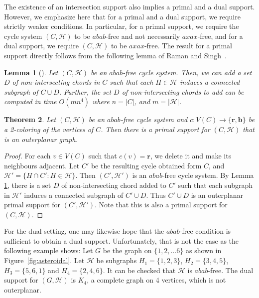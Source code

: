 \documentclass[12pt]{article}
\newcommand{\R}{\mathbf{r}}
\newcommand{\B}{\mathbf{b}}
\newcommand{\HH}{\mathcal{H}}
\newtheorem{theorem}{Theorem}
\newtheorem{lemma}[theorem]{Lemma}
\theoremstyle{case}
\begin{document}
The existence of an intersection support also implies a primal and a dual support.
However, we emphasize here that for a primal and a dual support, we require strictly weaker conditions.
In particular, for a primal support, we require the cycle system $(C,\HH)$ to be $abab$-free and not necessarily $axax$-free, and for a dual support, we require $(C,\HH)$ to be $axax$-free.
The result for a primal support directly follows from the following lemma of Raman and Singh~\cite{raman2025supportsgraphsboundedgenus}.

\begin{lemma}[\cite{raman2025supportsgraphsboundedgenus}]
\label{lem:nblock}
Let $(C,\HH)$ be an $abab$-free cycle system.
Then, we can add a set $D$ of non-intersecting chords in $C$ such that each $H\in\mathcal{H}$ 
induces a connected subgraph of $C\cup D$. Further, the set $D$ of non-intersecting chords to add can be computed in time $O(mn^4)$ where $n=|C|$, and $m=|\HH|$.
\end{lemma}

\begin{theorem}\label{thm:primalopsupport}
Let $(C,\HH)$ be an $abab$-free cycle system and $c:V(C)\to\{\R,\B\}$ be a 2-coloring of the vertices of $C$.
Then there is a primal support for $(C,\HH)$ that is an outerplanar graph.
\end{theorem}
\begin{proof}
For each $v\in V(C)$ such that $c(v)=\R$, we delete it and make its neighbours adjacent.
Let $C'$ be the resulting cycle obtained form $C$, and $\HH'=\{H\cap C':H\in\HH\}$.
Then $(C',\HH')$ is an $abab$-free cycle system.
By Lemma \ref{lem:nblock}, there is a set $D$ of non-intersecting chord added to $C'$ such that each subgraph in $\HH'$ induces a connected subgraph of $C'\cup D$. Thus $C'\cup D$ is an outerplanar primal support for $(C',\HH')$.
Note that this is also a primal support for $(C,\HH)$.
\end{proof}

For the dual setting, one may likewise hope that
the $abab$-free condition is sufficient to obtain a
dual support. Unfortunately, that is not the case as the following
example shows:
Let $G$ be the graph on $\{1,2,\ldots 6\}$ as shown in Figure~\ref{fig:asteroidal}.
Let $\mathcal{H}$ be subgraphs 
$H_1=\{1,2,3\}$, $H_2=\{3,4,5\}$, $H_3=\{5,6,1\}$ and $H_4=\{2,4,6\}$.
It can be checked that $\mathcal{H}$ is $abab$-free.
The dual support for $(G,\HH)$ is $K_4$, a complete graph on 4 vertices, which is not outerplanar.
\end{document}
